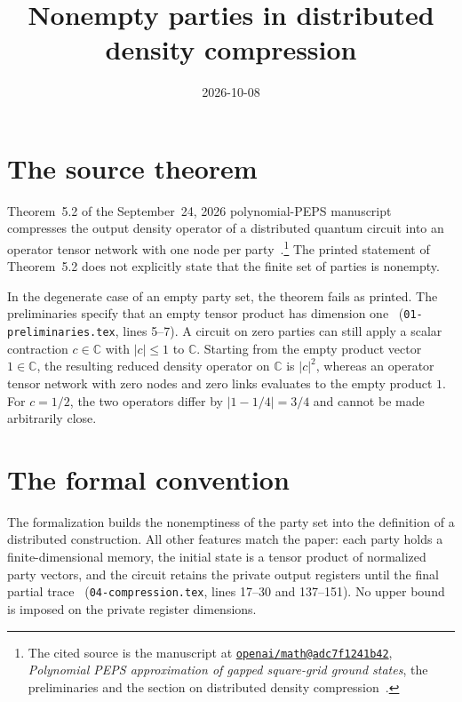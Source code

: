 \documentclass[11pt]{article}
\title{Nonempty parties in distributed density compression}
\author{}
\date{2026-10-08}
\begin{document}
\maketitle
{}

\section{The source theorem}

Theorem~5.2 of the September~24, 2026 polynomial-PEPS manuscript compresses the
output density operator of a distributed quantum circuit into an operator
tensor network with one node per
party~\cite[Theorem~5.2]{OpenAI2026PolynomialPEPS}.\footnote{The cited source
is the manuscript at
\href{https://github.com/openai/math/tree/adc7f1241b42e322a6451854ab7e4b4c146bf78a}{\texttt{openai/math@adc7f1241b42}},
\emph{Polynomial PEPS approximation of gapped square-grid ground states},
the preliminaries and the section on distributed density
compression~\cite{OpenAI2026PolynomialPEPS}.}
The printed statement of Theorem~5.2 does not explicitly state that the finite
set of parties is nonempty.

In the degenerate case of an empty party set, the theorem fails as printed. The
preliminaries specify that an empty tensor product has dimension
one~\cite[preliminaries]{OpenAI2026PolynomialPEPS} (\texttt{01-preliminaries.tex},
lines 5--7). A circuit on zero parties can still apply a scalar contraction
$c\in\mathbb C$ with $|c|\le 1$ to $\mathbb C$. Starting from the empty product
vector $1\in\mathbb C$, the resulting reduced density operator on $\mathbb C$
is $|c|^2$, whereas an operator tensor network with zero nodes and zero links
evaluates to the empty product $1$. For $c=1/2$, the two operators differ by
$|1 - 1/4| = 3/4$ and cannot be made arbitrarily close.

\section{The formal convention}

The formalization builds the nonemptiness of the party set into the definition
of a distributed construction. All other features match the paper: each party
holds a finite-dimensional memory, the initial state is a tensor product of
normalized party vectors, and the circuit retains the private output registers
until the final partial trace~\cite[Theorem~5.2]{OpenAI2026PolynomialPEPS}
(\texttt{04-compression.tex}, lines 17--30 and 137--151). No upper bound is
imposed on the private register dimensions.
\end{document}
